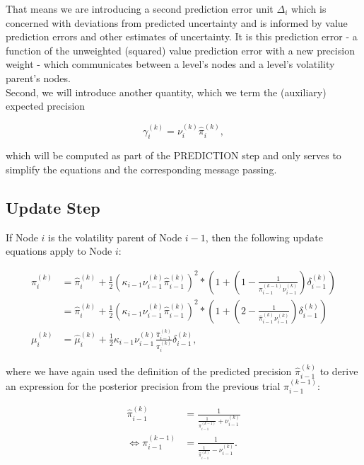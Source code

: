 That means we are introducing a second prediction error unit $\Delta_i$ which is concerned with deviations from predicted uncertainty and is informed by value prediction errors and other estimates of uncertainty. It is this prediction error - a function of the unweighted (squared) value prediction error with a new precision weight - which communicates between a level's nodes and a level's volatility parent's nodes.\\

Second, we will introduce another quantity, which we term the (auxiliary) expected precision

\begin{equation}
  \gamma_i^{(k)} = \nu_i^{(k)} \hat{\pi}_i^{(k)},
\end{equation}

which will be computed as part of the \textsf{PREDICTION step} and only serves to simplify the equations and the corresponding message passing.

\subsection{Update Step}
If Node $i$ is the volatility parent of Node $i-1$, then the following update equations apply to Node $i$:

\begin{align*}
\pi_i^{(k)} &= \hat{\pi}_i^{(k)} 
			+ \frac{1}{2}(\kappa_{i-1} \nu_{i-1}^{(k)} \hat{\pi}_{i-1}^{(k)})^2
			* (1 + (1 - \frac{1}{\pi_{i-1}^{(k-1)} \nu_{i-1}^{(k)}}) 
			\delta_{i-1}^{(k)})\\
			&= \hat{\pi}_i^{(k)} 
			+ \frac{1}{2}(\kappa_{i-1} \nu_{i-1}^{(k)} \hat{\pi}_{i-1}^{(k)})^2
			* (1 + (2 - \frac{1}{\hat{\pi}_{i-1}^{(k)} \nu_{i-1}^{(k)}}) 
			\delta_{i-1}^{(k)})\\
\mu_i^{(k)} &= \hat{\mu}_i^{(k)} 
			+ \frac{1}{2}\kappa_{i-1} \nu_{i-1}^{(k)} 
			\frac{\hat{\pi}_{i-1}^{(k)}}{\pi_{i}^{(k)}} \delta_{i-1}^{(k)},
\end{align*}			

where we have again used the definition of the predicted precision $\hat{\pi}_{i-1}^{(k)}$ to derive an expression for the posterior precision from the previous trial $\pi_{i-1}^{(k-1)}$:

\begin{align*}
\hat{\pi}_{i-1}^{(k)} 			  &= \frac{1}{ \frac{1}{\pi_{i-1}^{(k-1)}}
								  + \nu_{i-1}^{(k)} }\\
\Leftrightarrow \pi_{i-1}^{(k-1)} &= \frac{1}{ \frac{1}{\hat{\pi}_{i-1}^{(k)}}
					  			  - \nu_{i-1}^{(k)} }.
\end{align*}

